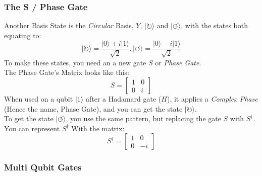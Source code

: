 \documentclass[../main.tex]{subfiles}
\begin{document}
\subsubsection{The S / Phase Gate}

Another Basis State is the \emph{Circular} Basis, $Y$,
$\lvert\circlearrowright\rangle$ and $\lvert\circlearrowleft\rangle$, with the
states both equating to:\\
\begin{equation}
	\lvert\circlearrowright\rangle = \frac{\lvert0\rangle +i\lvert1\rangle}{\sqrt{2}}, \lvert\circlearrowleft\rangle = \frac{\lvert0\rangle -i\lvert1\rangle}{\sqrt{2}}
\end{equation}
To make these states, you need an a new gate \(S\) or \emph{Phase
Gate}.\\
The Phase Gate's Matrix looks like this:\\
\begin{equation}
	S = \left[ \begin{matrix} 1 & 0\\0 & i\end{matrix} \right]
\end{equation}
When used on a qubit $\lvert1\rangle$ after a Hadamard gate (\(H\)), it
applies a \emph{Complex Phase} (Hence the name, Phase Gate), and you can
get the state \(\lvert\circlearrowright\rangle\).\\
To get the state \(\lvert\circlearrowleft\rangle\), you use the same pattern,
but replacing the gate \(S\) with \(S^\dagger\).\\
You can represent \(S^\dagger\) With the matrix:\\
\begin{equation}
	S^\dagger = \left[ \begin{matrix} 1 & 0\\0 & -i\end{matrix} \right]
\end{equation}

\subsubsection{Multi Qubit Gates}
\end{document}
